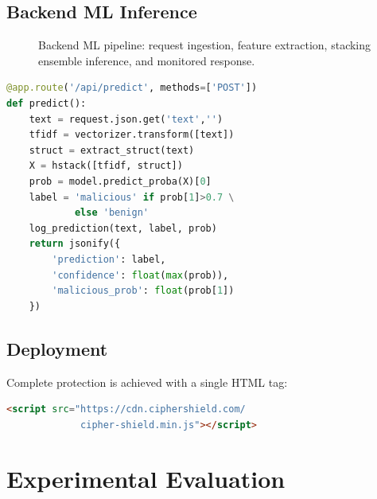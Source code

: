 \documentclass[10pt,twocolumn]{article}
\begin{document}
\subsection{Backend ML Inference}

\begin{figure}[H]
  \centering
  \caption{Backend ML pipeline: request ingestion, feature extraction,
           stacking ensemble inference, and monitored response.}
  \label{fig:backend}
\end{figure}

\begin{lstlisting}[language=Python, caption={ML prediction endpoint}]
@app.route('/api/predict', methods=['POST'])
def predict():
    text = request.json.get('text','')
    tfidf = vectorizer.transform([text])
    struct = extract_struct(text)
    X = hstack([tfidf, struct])
    prob = model.predict_proba(X)[0]
    label = 'malicious' if prob[1]>0.7 \
            else 'benign'
    log_prediction(text, label, prob)
    return jsonify({
        'prediction': label,
        'confidence': float(max(prob)),
        'malicious_prob': float(prob[1])
    })
\end{lstlisting}

\subsection{Deployment}

Complete protection is achieved with a single HTML tag:
\begin{lstlisting}[language=HTML, caption={One-line integration}]
<script src="https://cdn.ciphershield.com/
             cipher-shield.min.js"></script>
\end{lstlisting}

\section{Experimental Evaluation}
\label{sec:eval}
\end{document}
